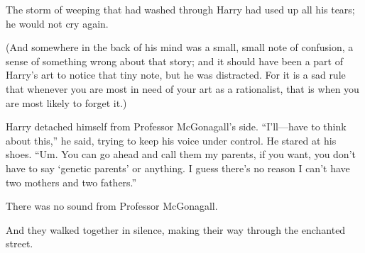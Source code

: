 The storm of weeping that had washed through Harry had used up all his tears;
he would not cry again.

(And somewhere in the back of his mind was a small, small note of confusion, a
sense of something wrong about that story; and it should have been a part of
Harry’s art to notice that tiny note, but he was distracted. For it is a sad
rule that whenever you are most in need of your art as a rationalist, that is
when you are most likely to forget it.)

Harry detached himself from Professor McGonagall’s side. “I’ll—have to think
about this,” he said, trying to keep his voice under control. He stared at his
shoes. “Um. You can go ahead and call them my parents, if you want, you don’t
have to say ‘genetic parents’ or anything. I guess there’s no reason I can’t
have two mothers and two fathers.”

There was no sound from Professor McGonagall.

And they walked together in silence, making their way through the enchanted street.
